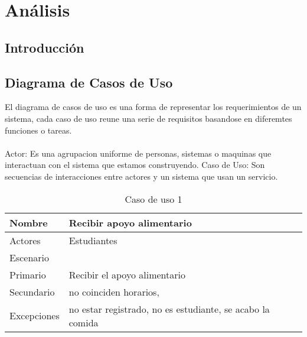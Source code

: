 \chapter{Análisis}

\section{Introducción}


\section{Diagrama de Casos de Uso}
El diagrama de casos de uso es una forma de representar los requerimientos de un sistema, cada caso de uso reune una serie de requisitos basandose en diferemtes funciones o tareas.
\\
\\
Actor: Es una agrupacion uniforme de personas, sistemas o maquinas que interactuan con el sistema que estamos construyendo.   
Caso de Uso: Son secuencias de interacciones entre actores y un sistema que usan un servicio. 

\begin{table}[]
	\centering
	\caption{Caso de uso 1}
	\label{my-label}
	\begin{tabular}{|l|l|}
		\hline
		Nombre      & Recibir apoyo alimentario                                 \\ \hline
		Actores     & Estudiantes                                               \\ \hline
		Escenario   &                                                           \\ \hline
		Primario    & Recibir el apoyo alimentario                              \\ \hline
		Secundario  & no coinciden horarios,                                    \\ \hline
		Excepciones & no estar registrado, no es estudiante, se acabo la comida \\ \hline
	\end{tabular}
\end{table}

